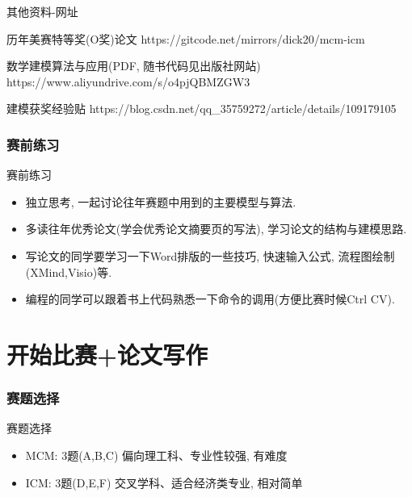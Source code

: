 \documentclass{ctexbeamer}
\begin{document}
\begin{frame}{其他资料-网址}
	\begin{exampleblock}{历年美赛特等奖(O奖)论文}
		https://gitcode.net/mirrors/dick20/mcm-icm
	\end{exampleblock}

	\begin{exampleblock}{数学建模算法与应用(PDF, 随书代码见出版社网站)}
		https://www.aliyundrive.com/s/o4pjQBMZGW3
	\end{exampleblock}

	\begin{exampleblock}{建模获奖经验贴}
		https://blog.csdn.net/qq\_35759272/article/details/109179105
	\end{exampleblock}
\end{frame}



\subsubsection{赛前练习} %
\label{ssub:赛前练习}

\begin{frame}{赛前练习}
	\begin{itemize}
		\item 独立思考, 一起讨论往年赛题中用到的主要模型与算法.
		\item 多读往年优秀论文(学会优秀论文摘要页的写法), 学习论文的结构与建模思路.
		\item 写论文的同学要学习一下Word排版的一些技巧, 快速输入公式, 流程图绘制(XMind,Visio)等.
		\item 编程的同学可以跟着书上代码熟悉一下命令的调用(方便比赛时候Ctrl CV).
	\end{itemize}
\end{frame}



\section{开始比赛+论文写作} %
\label{sec:论文写作}

\subsubsection{赛题选择} %
\label{ssub:赛题选择}

\begin{frame}{赛题选择}
	\begin{itemize}
		\item MCM: 3题(A,B,C)  偏向理工科、专业性较强, 有难度
		      \vspace{5pt}
		\item ICM: 3题(D,E,F)  交叉学科、适合经济类专业, 相对简单

	\end{itemize}
\end{frame}
\end{document}
